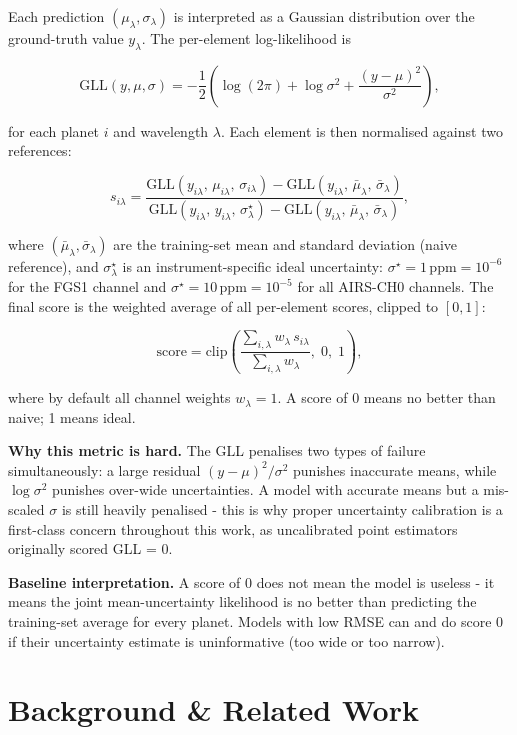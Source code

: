 \documentclass[12pt]{article}
\begin{document}
Each prediction $(\mu_\lambda, \sigma_\lambda)$ is interpreted as a Gaussian distribution over the ground-truth value $y_\lambda$. The per-element log-likelihood is

\[
\mathrm{GLL}(y,\mu,\sigma) = -\frac{1}{2}\!\left(\log(2\pi) + \log\sigma^{2} + \frac{(y-\mu)^2}{\sigma^2}\right),
\]

for each planet $i$ and wavelength $\lambda$. Each element is then normalised against two references:

\[
s_{i\lambda} = \frac{\mathrm{GLL}(y_{i\lambda},\,\mu_{i\lambda},\,\sigma_{i\lambda}) - \mathrm{GLL}(y_{i\lambda},\,\bar{\mu}_\lambda,\,\bar{\sigma}_\lambda)}{\mathrm{GLL}(y_{i\lambda},\,y_{i\lambda},\,\sigma^\star_\lambda) - \mathrm{GLL}(y_{i\lambda},\,\bar{\mu}_\lambda,\,\bar{\sigma}_\lambda)},
\]

where $(\bar{\mu}_\lambda, \bar{\sigma}_\lambda)$ are the training-set mean and standard deviation (naive reference), and $\sigma^\star_\lambda$ is an instrument-specific ideal uncertainty: $\sigma^\star = 1\,\text{ppm} = 10^{-6}$ for the FGS1 channel and $\sigma^\star = 10\,\text{ppm} = 10^{-5}$ for all AIRS-CH0 channels. The final score is the weighted average of all per-element scores, clipped to $[0, 1]$:

\[
\text{score} = \mathrm{clip}\!\left(\frac{\sum_{i,\lambda} w_\lambda\, s_{i\lambda}}{\sum_{i,\lambda} w_\lambda},\; 0,\; 1\right),
\]

where by default all channel weights $w_\lambda = 1$. A score of 0 means no better than naive; 1 means ideal.

\textbf{Why this metric is hard.} The GLL penalises two types of failure simultaneously: a large residual $(y - \mu)^2/\sigma^2$ punishes inaccurate means, while $\log\sigma^2$ punishes over-wide uncertainties. A model with accurate means but a mis-scaled $\sigma$ is still heavily penalised - this is why proper uncertainty calibration is a first-class concern throughout this work, as uncalibrated point estimators originally scored GLL = 0.

\textbf{Baseline interpretation.} A score of 0 does not mean the model is useless - it means the joint mean-uncertainty likelihood is no better than predicting the training-set average for every planet. Models with low RMSE can and do score 0 if their uncertainty estimate is uninformative (too wide or too narrow).


\section{Background \& Related Work}
\end{document}

